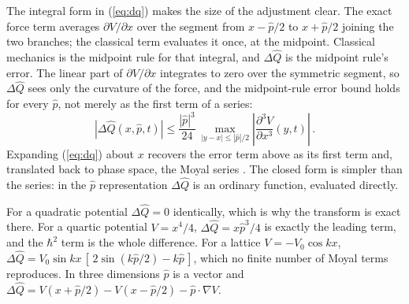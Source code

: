 \documentclass[12pt]{article}
\begin{document}
The integral form in (\ref{eq:dq}) makes the size of the adjustment clear.  The exact force term averages $\partial V/\partial x$ over the segment from $x-\hat{p}/2$ to $x+\hat{p}/2$ joining the two branches; the classical term evaluates it once, at the midpoint.  Classical mechanics is the midpoint rule for that integral, and $\Delta\hat{Q}$ is the midpoint rule's error.  The linear part of $\partial V/\partial x$ integrates to zero over the symmetric segment, so $\Delta\hat{Q}$ sees only the curvature of the force, and the midpoint-rule error bound holds for every $\hat{p}$, not merely as the first term of a series:
\begin{equation}\label{eq:dq-bound}
|\Delta\hat{Q}(x,\hat{p},t)| \le \frac{|\hat{p}|^3}{24}\,\max_{|y-x| \le |\hat{p}|/2}\left|\frac{\partial^3 V}{\partial x^3}(y,t)\right| \,.
\end{equation}
Expanding (\ref{eq:dq}) about $x$ recovers the error term above as its first term and, translated back to phase space, the Moyal series \cite{moyal1949,hillery1984}.  The closed form is simpler than the series: in the $\hat{p}$ representation $\Delta\hat{Q}$ is an ordinary function, evaluated directly.

For a quadratic potential $\Delta\hat{Q} = 0$ identically, which is why the transform is exact there.  For a quartic potential $V = x^4/4$, $\Delta\hat{Q} = x\hat{p}^3/4$ is exactly the leading term, and the $\hbar^2$ term is the whole difference.  For a lattice $V = -V_0\cos kx$, $\Delta\hat{Q} = V_0 \sin kx\,[\,2\sin(k\hat{p}/2) - k\hat{p}\,]$, which no finite number of Moyal terms reproduces.  In three dimensions $\hat{p}$ is a vector and $\Delta\hat{Q} = V(x+\hat{p}/2) - V(x-\hat{p}/2) - \hat{p}\cdot\nabla V$.
\end{document}
